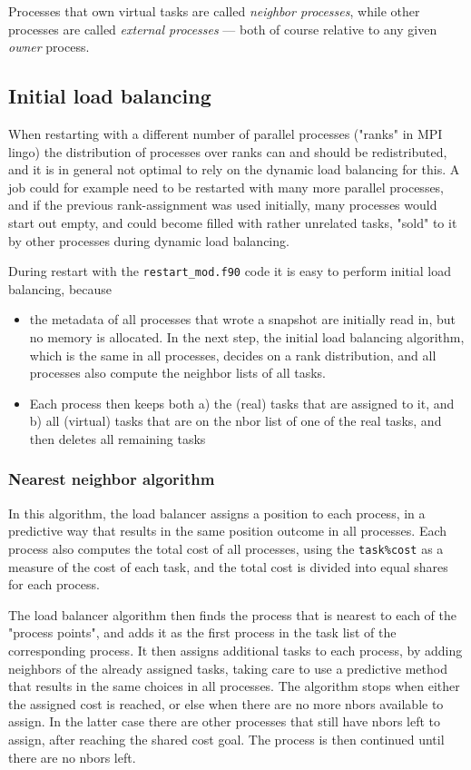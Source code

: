 \documentclass[paper=a4,fontsize=11pt]{scrartcl}
\numberwithin{equation}{section}		%
\numberwithin{figure}{section}			%
\numberwithin{table}{section}				%
\newcommand{\codecolor}{\color{Blue}}
\newcommand{\filecolor}{\color{NavyBlue}}
\newcommand{\File}[1]{{\filecolor\texttt{#1}}}
\newcommand{\Code}[1]{{\codecolor\texttt{#1}}}
\begin{document}
Processes that own virtual tasks are called \textit{neighbor processes}, while other processes are called \textit{external processes} --- both of course relative to any given \textit{owner} process.

\subsection{Initial load balancing}
When restarting with a different number of parallel processes ("ranks" in MPI lingo) the distribution of processes over ranks can and should be redistributed, and it is in general not optimal to rely on the dynamic load balancing for this.   A job could for example need to be restarted with many more parallel processes, and if the previous rank-assignment was used initially, many processes would start out empty, and could become filled with rather unrelated tasks, "sold" to it by other processes during dynamic load balancing.

During restart with the \File{restart\_mod.f90} code it is easy to perform initial load balancing, because
\begin{itemize}
    \item the metadata of all processes that wrote a snapshot are initially read in, but no memory is allocated.  In the next step, the initial load balancing algorithm, which is the same in all processes, decides on a rank distribution, and all processes also compute the neighbor lists of all tasks.
    \item Each process then keeps both a) the (real) tasks that are assigned to it, and b) all (virtual) tasks that are on the nbor list of one of the real tasks, and then deletes all remaining tasks
\end{itemize}

\subsubsection{Nearest neighbor algorithm}
In this algorithm, the load balancer assigns a position to each process, in a predictive way that results in the same position outcome in all processes.  Each process also computes the total cost of all processes, using the \Code{task\%cost} as a measure of the cost of each task, and the total cost is divided into equal shares for each process.  

The load balancer algorithm then finds the process that is nearest to each of the "process points", and adds it as the first process in the task list of the corresponding process.  It then assigns additional tasks to each process, by adding neighbors of the already assigned tasks, taking care to use a predictive method that results in the same choices in all processes.  The algorithm stops when either the assigned cost is reached, or else when there are no more nbors available to assign.  In the latter case there are other processes that still have nbors left to assign, after reaching the shared cost goal.  The process is then continued until there are no nbors left.
\end{document}
